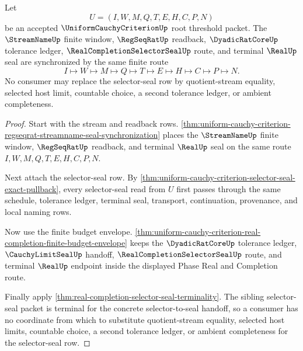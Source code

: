 \begin{theorem}
\label{thm:uniform-cauchy-criterion-selector-seal-synchronization}
Let
$$
U=(I,W,M,Q,T,E,H,C,P,N)
$$
be an accepted $\UniformCauchyCriterionUp$ root threshold packet. The $\StreamNameUp$ finite window, $\RegSeqRatUp$ readback, $\DyadicRatCoreUp$ tolerance ledger, $\RealCompletionSelectorSealUp$ route, and terminal $\RealUp$ seal are synchronized by the same finite route
$$
I \longmapsto W \longmapsto M \longmapsto Q \longmapsto T \longmapsto E \longmapsto H \longmapsto C \longmapsto P \longmapsto N.
$$
No consumer may replace the selector-seal row by quotient-stream equality, selected host limit, countable choice, a second tolerance ledger, or ambient completeness.
\end{theorem}
\begin{proof}
Start with the stream and readback rows. \autoref{thm:uniform-cauchy-criterion-regseqrat-streamname-seal-synchronization} places the $\StreamNameUp$ finite window, $\RegSeqRatUp$ readback, and terminal $\RealUp$ seal on the same route $I,W,M,Q,T,E,H,C,P,N$.

Next attach the selector-seal row. By \autoref{thm:uniform-cauchy-criterion-selector-seal-exact-pullback}, every selector-seal read from $U$ first passes through the same schedule, tolerance ledger, terminal seal, transport, continuation, provenance, and local naming rows.

Now use the finite budget envelope. \autoref{thm:uniform-cauchy-criterion-real-completion-finite-budget-envelope} keeps the $\DyadicRatCoreUp$ tolerance ledger, $\CauchyLimitSealUp$ handoff, $\RealCompletionSelectorSealUp$ route, and terminal $\RealUp$ endpoint inside the displayed Phase Real and Completion route.

Finally apply \autoref{thm:real-completion-selector-seal-terminality}. The sibling selector-seal packet is terminal for the concrete selector-to-seal handoff, so a consumer has no coordinate from which to substitute quotient-stream equality, selected host limits, countable choice, a second tolerance ledger, or ambient completeness for the selector-seal row.
\end{proof}

